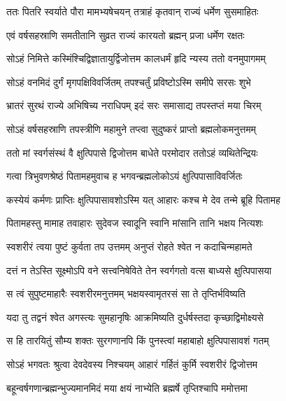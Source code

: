 \twolineshloka
{ततः पितरि स्वर्याते पौरा मामभ्यषेचयन्}
{तत्राहं कृतवान् राज्यं धर्मेण सुसमाहितः} %

\twolineshloka
{एवं वर्षसहस्राणि समतीतानि सुव्रत}
{राज्यं कारयतो ब्रह्मन् प्रजा धर्मेण रक्षतः} %

\twolineshloka
{सोऽहं निमित्ते कस्मिंश्चिद्विज्ञातायुर्द्विजोत्तम}
{कालधर्मं हृदि न्यस्य ततो वनमुपागमम्} %

\twolineshloka
{सोऽहं वनमिदं दुर्गं मृगपक्षिविवर्जितम्}
{तपश्चर्तुं प्रविष्टोऽस्मि समीपे सरसः शुभे} %

\twolineshloka
{भ्रातरं सुरथं राज्ये अभिषिच्य नराधिपम्}
{इदं सरः समासाद्य तपस्तप्तं मया चिरम्} %

\twolineshloka
{सोऽहं वर्षसहस्राणि तपस्त्रीणि महामुने}
{तप्त्वा सुदुष्करं प्राप्तो ब्रह्मलोकमनुत्तमम्} %

\twolineshloka
{ततो मां स्वर्गसंस्थं वै क्षुत्पिपासे द्विजोत्तम}
{बाधेते परमोदार ततोऽहं व्यथितेन्द्रियः} %

\twolineshloka
{गत्वा त्रिभुवणश्रेष्ठं पितामहमुवाच ह}
{भगवन्ब्रह्मलोकोऽयं क्षुत्पिपासाविवर्जितः} %

\twolineshloka
{कस्येयं कर्मणः प्राप्तिः क्षुत्पिपासावशोऽस्मि यत्}
{आहारः कश्च मे देव तन्मे ब्रूहि पितामह} %

\twolineshloka
{पितामहस्तु मामाह तवाहारः सुदेवज}
{स्वादूनि स्वानि मांसानि तानि भक्षय नित्यशः} %

\twolineshloka
{स्वशरीरं त्वया पुष्टं कुर्वता तप उत्तमम्}
{अनुप्तं रोहते श्वेत न कदाचिन्महामते} %

\twolineshloka
{दत्तं न तेऽस्ति सूक्ष्मोऽपि वने सत्त्वनिषेविते}
{तेन स्वर्गगतो वत्स बाध्यसे क्षुत्पिपासया} %

\twolineshloka
{स त्वं सुपुष्टमाहारैः स्वशरीरमनुत्तमम्}
{भक्षयस्वामृतरसं सा ते तृप्तिर्भविष्यति} %

\twolineshloka
{यदा तु तद्वनं श्वेत अगस्त्यः सुमहानृषिः}
{आक्रमिष्यति दुर्धर्षस्तदा कृच्छाद्विमोक्ष्यसे} %

\twolineshloka
{स हि तारयितुं सौम्य शक्तः सुरगणानपि}
{किं पुनस्त्वां महाबाहो क्षुत्पिपासावशं गतम्} %

\twolineshloka
{सोऽहं भगवतः श्रुत्वा देवदेवस्य निश्चयम्}
{आहारं गर्हितं कुर्मि स्वशरीरं द्विजोत्तम} %

\twolineshloka
{बहून्वर्षगणान्ब्रह्मन्भुज्यमानमिदं मया}
{क्षयं नाभ्येति ब्रह्मर्षे तृप्तिश्चापि ममोत्तमा} %

